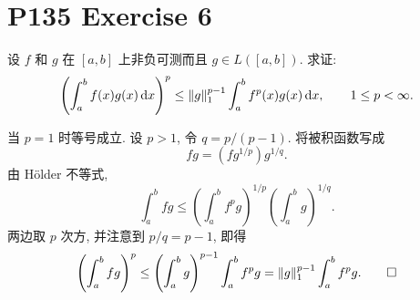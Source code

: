 \documentclass{article}
\begin{document}
\section{P135 Exercise 6}

设 $f$ 和 $g$ 在 $[a,b]$ 上非负可测而且 $g\in L([a,b])$. 求证:
\[
  \left(\int_a^b f(x)g(x)\,\mathrm{d} x\right)^p
  \le \|g\|_1^{p-1}\int_a^b f^p(x)g(x)\,\mathrm{d} x,
  \qquad 1\le p<\infty.
\]

\begin{solution}
  当 $p=1$ 时等号成立. 设 $p>1$, 令 $q=p/(p-1)$.
  将被积函数写成
  \[
    f g=(f g^{1/p})g^{1/q}.
  \]
  由 Hölder 不等式,
  \[
    \int_a^b fg
    \le
    \left(\int_a^b f^p g\right)^{1/p}
    \left(\int_a^b g\right)^{1/q}.
  \]
  两边取 $p$ 次方, 并注意到 $p/q=p-1$, 即得
  \[
    \left(\int_a^b fg\right)^p
    \le\left(\int_a^b g\right)^{p-1}\int_a^b f^p g
    =\|g\|_1^{p-1}\int_a^b f^p g.
    \qed
  \]
\end{solution}
\end{document}
